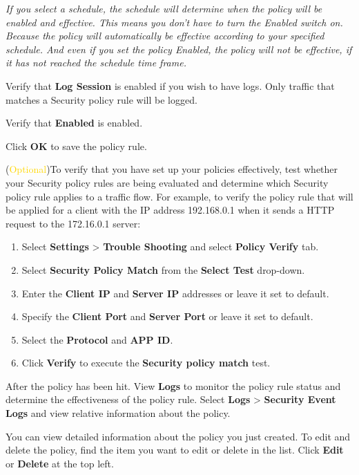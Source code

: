 \begin{description}
    
    \notemark\textit{If you select a schedule, the schedule will determine when the policy will be enabled and effective. 
    This means you don’t have to turn the Enabled switch on. Because the policy will automatically be effective according to your specified schedule. 
    And even if you set the policy Enabled, the policy will not be effective, if it has not reached the schedule time frame.}
    \item[STEP 11.]	Verify that \textbf{Log Session} is enabled if you wish to have logs. Only traffic that matches a Security policy rule will be logged. 
    \item[STEP 12.]	Verify that \textbf{Enabled} is enabled.
    \item[STEP 13.]	Click \textbf{OK} to save the policy rule.
    \item[STEP 14.]	(\textcolor{gold}{Optional})To verify that you have set up your policies effectively, test whether your Security policy rules are being evaluated and determine which Security policy rule applies to a traffic flow. For example, to verify the policy rule that will be applied for a client with the IP address 192.168.0.1 when it sends a HTTP request to the 172.16.0.1 server:
    \begin{enumerate} 
        \item Select \textbf{Settings} > \textbf{Trouble Shooting} and select \textbf{Policy Verify} tab.
        \item Select \textbf{Security Policy Match} from the \textbf{Select Test} drop-down. 
        \item Enter the \textbf{Client IP} and \textbf{Server IP} addresses or leave it set to default.
        \item Specify the \textbf{Client Port} and \textbf{Server Port} or leave it set to default.
        \item Select the \textbf{Protocol} and \textbf{APP ID}. 
        \item Click \textbf{Verify} to execute the \textbf{Security policy match} test.
    \end{enumerate}
    \item[STEP 15.]	After the policy has been hit. View \textbf{Logs} to monitor the policy rule status and determine the effectiveness of the policy rule. 
    Select \textbf{Logs} > \textbf{Security Event Logs} and view relative information about the policy.
\end{description}

You can view detailed information about the policy you just created. To edit and delete the policy, find the item you want to edit or delete in the list. Click \textbf{Edit} or \textbf{Delete} at the top left.


